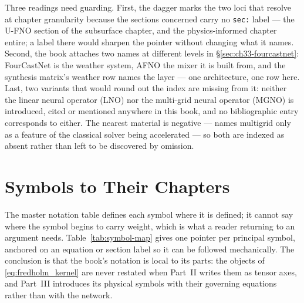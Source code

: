 Three readings need guarding. First, the dagger marks the two loci that resolve at chapter
granularity because the sections concerned carry no \texttt{sec:} label --- the U-FNO
section of the subsurface chapter, and the physics-informed chapter entire; a label there
would sharpen the pointer without changing what it names. Second, the book attaches two
names at different levels in \S\ref{sec:ch33-fourcastnet}: FourCastNet is the weather
system, AFNO \cite{pathak2022fourcastnet,guibas2021afno} the mixer it is built from, and the
synthesis matrix's weather row names the layer --- one architecture, one row here. Last, two
variants that would round out the index are missing from it: neither the linear neural
operator (LNO) nor the multi-grid neural operator (MGNO) is introduced, cited or mentioned
anywhere in this book, and no bibliographic entry corresponds to either. The nearest
material is negative --- 
names multigrid only as a feature of the classical solver being accelerated --- so both are
indexed as absent rather than left to be discovered by omission.

\section{Symbols to Their Chapters}
\label{sec:ape-notation}

The master notation table defines each symbol where it is defined; it cannot say where the
symbol begins to carry weight, which is what a reader returning to an argument needs.
Table~\ref{tab:symbol-map} gives one pointer per principal symbol, anchored on an equation
or section label so it can be followed mechanically. The conclusion is that the book's
notation is local to its parts: the objects of \eqref{eq:fredholm_kernel} are never
restated when Part~II writes them as tensor axes, and Part~III introduces its physical
symbols with their governing equations rather than with the network.


